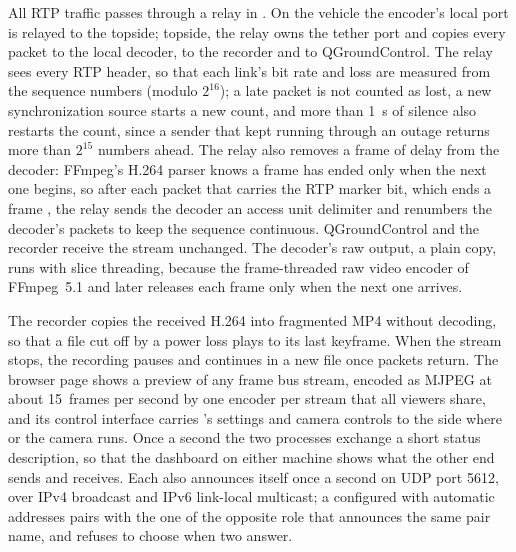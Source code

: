All RTP traffic passes through a relay in \hellion{}. On the vehicle
the encoder's
local port is relayed to the topside; topside, the relay owns the
tether port and
copies every packet to the local decoder, to the recorder and to
QGroundControl. The
relay sees every RTP header, so that each link's bit rate and loss
are measured from
the sequence numbers (modulo $2^{16}$); a late packet is not counted
as lost, a new
synchronization source starts a new count, and more than 1~s of
silence also restarts
the count, since a sender that kept running through an outage returns more than
$2^{15}$ numbers ahead. The relay also removes a frame of delay from
the decoder:
FFmpeg's H.264 parser knows a frame has ended only when the next one begins, so
after each packet that carries the RTP marker bit, which ends a frame
\cite{rfc6184}, the relay sends the decoder an access unit delimiter
and renumbers the
decoder's packets to keep the sequence continuous. QGroundControl and
the recorder
receive the stream unchanged. The decoder's raw output, a plain copy,
runs with slice
threading, because the frame-threaded raw video encoder of FFmpeg~5.1 and later
releases each frame only when the next one arrives.

The recorder copies the received H.264 into fragmented MP4 without
decoding, so that a
file cut off by a power loss plays to its last keyframe. When the
stream stops, the
recording pauses and continues in a new file once packets return. The
browser page
shows a preview of any frame bus stream, encoded as MJPEG at about 15~frames per
second by one encoder per stream that all viewers share, and its
control interface
carries \eeye{}'s settings and camera controls to the side where \eeye{} or the
camera runs. Once a second the two \hellion{} processes exchange a short status
description, so that the dashboard on either machine shows what the
other end sends
and receives. Each \hellion{} also announces itself once a second on
UDP port 5612,
over IPv4 broadcast and IPv6 link-local multicast; a \hellion{} configured with
automatic addresses pairs with the one of the opposite role that
announces the same
pair name, and refuses to choose when two answer.

